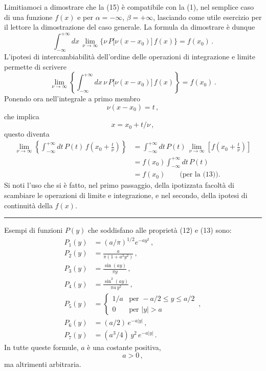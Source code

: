 \documentclass[11pt, a4paper]{book}
\numberwithin{equation}{section}
\begin{document}
\noindent Limitiamoci a dimostrare che la (15) è compatibile con la (1), nel semplice caso di una funzione $f(x)$ e per $\alpha = -\infty$, $\beta = +\infty$, lasciando come utile esercizio per il lettore la dimostrazione del caso generale. La formula da dimostrare è dunque
\[
\int_{-\infty}^{+\infty} dx\, \lim_{\nu \to \infty} \bigl\{\nu\, P\bigl[\nu(x - x_0)\bigr]\, f(x)\bigr\} = f(x_0) \,.
\]
L'ipotesi di intercambiabilità dell'ordine delle operazioni di integrazione e limite permette di scrivere
\[
\lim_{\nu \to \infty} \left\{ \int_{-\infty}^{+\infty} dx\, \nu\, P\bigl[\nu(x - x_0)\bigr]\, f(x) \right\} = f(x_0) \,.
\]
Ponendo ora nell'integrale a primo membro
\[
\nu(x - x_0) = t \,,
\]
che implica
\[
x = x_0 + t/\nu \,,
\]
questo diventa
\begin{align*}
\lim_{\nu \to \infty} \left\{ \int_{-\infty}^{+\infty} dt\, P(t)\, f\!\left(x_0 + \tfrac{t}{\nu}\right) \right\}
&= \int_{-\infty}^{+\infty} dt\, P(t)\, \lim_{\nu \to \infty} \left[ f\!\left(x_0 + \tfrac{t}{\nu}\right) \right] \\
&= f(x_0) \int_{-\infty}^{+\infty} dt\, P(t) \\
&= f(x_0) \qquad \text{(per la (13))}.
\end{align*}
Si noti l'uso che si è fatto, nel primo passaggio, della ipotizzata facoltà di scambiare le operazioni di limite e integrazione, e nel secondo, della ipotesi di continuità della $f(x)$.

\medskip\noindent\rule{\linewidth}{0.4pt}

Esempi di funzioni $P(y)$ che soddisfano alle proprietà (12) e (13) sono:
\begin{align}
P_1(y) &= (a/\pi)^{1/2} e^{-a y^2} \,, \tag{16} \\
P_2(y) &= \frac{a}{\pi(1 + a^2 y^2)} \,, \tag{17} \\
P_3(y) &= \frac{\sin(ay)}{\pi y} \,, \tag{18} \\
P_4(y) &= \frac{\sin^2(ay)}{\pi a\, y^2} \,, \tag{19} \\
P_5(y) &= \begin{cases} 1/a & \text{per } -a/2 \leq y \leq a/2 \\ 0 & \text{per } |y| > a \end{cases} \,, \tag{20} \\
P_6(y) &= (a/2)\, e^{-a|y|} \,, \tag{21} \\
P_7(y) &= (a^3/4)\, y^2\, e^{-a|y|} \,. \tag{22}
\end{align}
In tutte queste formule, $a$ è una costante positiva,
\begin{equation}
a > 0 \,, \tag{23}
\end{equation}
ma altrimenti arbitraria.
\end{document}
